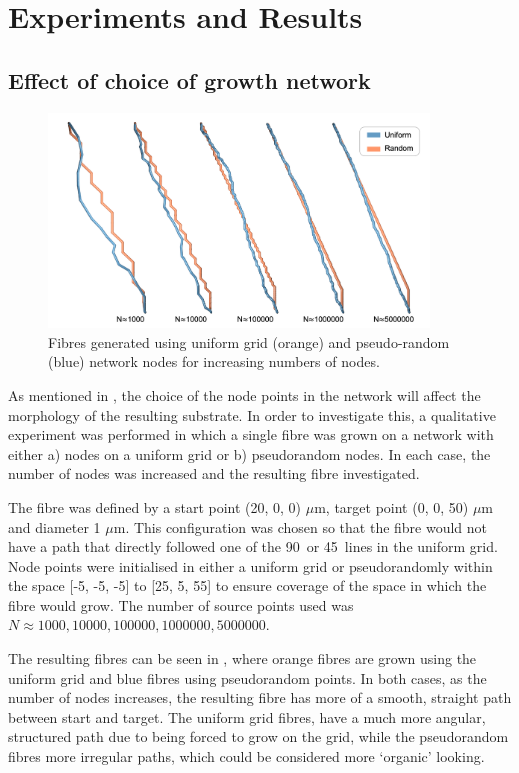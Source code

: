 \section{Experiments and Results}
\label{sec:impi_experiments_and_results}
\subsection{Effect of choice of growth network}
\label{sec:ipmi_choice_of_network}
\begin{figure}
  \centering
  \includegraphics[width=0.9\textwidth]{figures/ipmi_implementation/uniform_vs_rand.png}
  \caption{Fibres generated using uniform grid (orange) and pseudo-random (blue) network nodes for increasing numbers of nodes.}
  \label{fig:ipmi_uniform_vs_rand}
\end{figure}
As mentioned in , the choice of the node points in the network will affect the morphology of the resulting substrate.
In order to investigate this, a qualitative experiment was performed in which a single fibre was grown on a network with either a) nodes on a uniform grid or b) pseudorandom nodes.
In each case, the number of nodes was increased and the resulting fibre investigated.

The fibre was defined by a start point (20, 0, 0) $\mu$m,  target point (0, 0, 50) $\mu$m and diameter 1 $\mu$m.
This configuration was chosen so that the fibre would not have a path that directly followed one of the 90\degree\ or 45\degree\ lines in the uniform grid.
Node points were initialised in either a uniform grid or pseudorandomly within the space [-5, -5, -5] to [25, 5, 55] to ensure coverage of the space in which the fibre would grow.
The number of source points used was $N \approx 1000, 10000, 100000, 1000000, 5000000$.

The resulting fibres can be seen in , where orange fibres are grown using the uniform grid and blue fibres using pseudorandom points.
In both cases, as the number of nodes increases, the resulting fibre has more of a smooth, straight path between start and target.
The uniform grid fibres, have a much more angular, structured path due to being forced to grow on the grid, while the pseudorandom fibres more irregular paths, which could be considered more `organic' looking.


